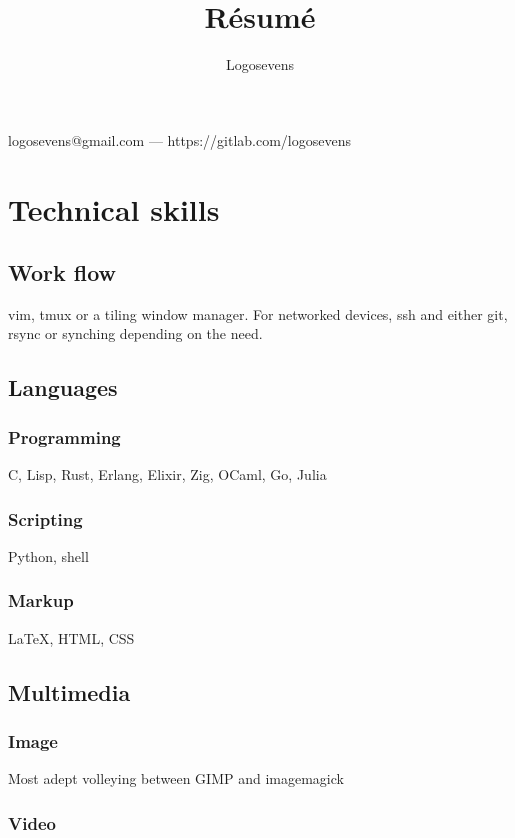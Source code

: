 \documentclass{article}
\makeatletter
\renewcommand{\maketitle}{
 \begin{center}
  {\huge\bfseries
  \theauthor}

  \vspace{1em}

  logosevens@gmail.com --- https://gitlab.com/logosevens

 \end{center}
}
\makeatother
\begin{document}
\title{R\'esum\'e}
\author{Logosevens}

\maketitle

\section{Technical skills}

\subsection{Work flow}

vim, tmux or a tiling window manager. For networked devices, ssh and either git, rsync or synching depending on the need.

\subsection{Languages}

\subsubsection{Programming}

C, Lisp, Rust, Erlang, Elixir, Zig, OCaml, Go, Julia

\subsubsection{Scripting}

Python, shell

\subsubsection{Markup}
{\LaTeX}, HTML, CSS
\subsection{Multimedia}

\subsubsection{Image}

Most adept volleying between GIMP and imagemagick

\subsubsection{Video}
\end{document}
